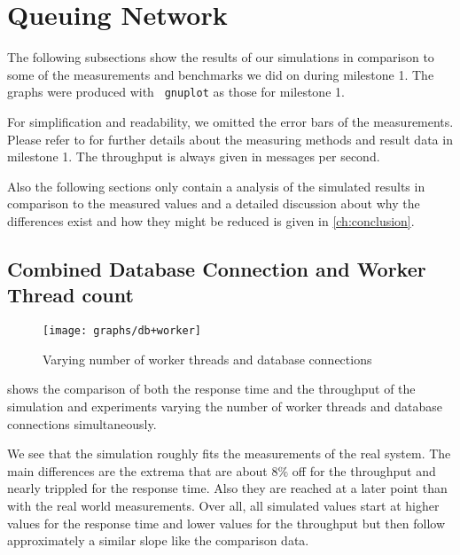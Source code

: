 \documentclass[a4paper, oneside]{csthesis}
\begin{document}
\section{Queuing Network}

    The following subsections show the results of our simulations in comparison
    to some of the measurements and benchmarks we did on \telesto{} during
    milestone 1. The graphs were produced with {\tt
    gnuplot} as those for milestone 1.
    
    For simplification and readability, we omitted the error bars of the
    measurements. Please refer to \cite{asl:telesto} for further details about
    the measuring methods and result data in milestone 1. The throughput is
    always given in messages per second.
    
    Also the following sections only contain a analysis of the simulated results
    in comparison to the measured values and a detailed discussion about why the
    differences exist and how they might be reduced is given in
    \cref{ch:conclusion}.

    \newpage

\subsection{Combined Database Connection and Worker Thread count}
   
    \begin{figure}[th]
        \centering
            \texttt{[image: graphs/db+worker]}
            \caption{Varying number of worker threads and database connections}
            \label{fig:db+worker}
    \end{figure}
    
     shows the comparison of both the response time and the
    throughput of the simulation and experiments varying the number of worker
    threads and database connections simultaneously.
    
    We see that the simulation roughly fits the measurements of the real
    \telesto{} system. The main differences are the extrema that are about $8
    \%$ off for the throughput and nearly trippled for the response time. Also
    they are reached at a later point than with the real world measurements.
    Over all, all simulated values start at higher values for the response
    time and lower values for the throughput but then follow approximately a
    similar slope like the comparison data.
    
\end{document}
